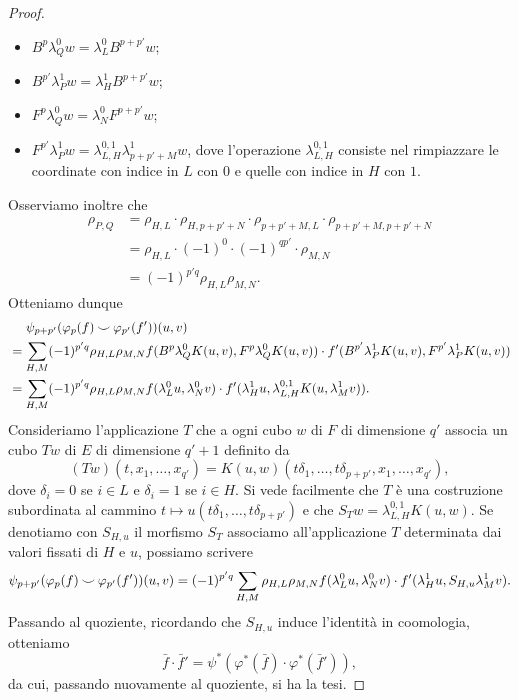 \begin{proof}
\begin{itemize}
\item $B^p\lambda^0_Qw=\lambda^0_LB^{p+p'}w$;
\item $B^{p'}\lambda^1_Pw=\lambda^1_HB^{p+p'}w$;
\item $F^p\lambda^0_Qw=\lambda^0_NF^{p+p'}w$;
\item $F^{p'}\lambda^1_Pw=\lambda^{0,1}_{L,H}\lambda^1_{p+p'+M}w$, dove l'operazione $\lambda^{0,1}_{L,H}$ consiste nel rimpiazzare le coordinate con indice in $L$ con $0$ e quelle con indice in $H$ con $1$.
\end{itemize}
Osserviamo inoltre che
\begin{align*}
\rho_{P,Q}&=\rho_{H,L}\cdot\rho_{H,p+p'+N}\cdot\rho_{p+p'+M,L}\cdot\rho_{p+p'+M,p+p'+N}\\
&=\rho_{H,L}\cdot (-1)^0\cdot(-1)^{qp'}\cdot\rho_{M,N}\\
&=(-1)^{p'q}\rho_{H,L}\rho_{M,N}.
\end{align*}
Otteniamo dunque
\begin{align*}
&\phantomop\psi_{p+p'}(\varphi_p(f)\cupp\varphi_{p'}(f'))(u,v)\\
&=\sum_{H,M}(-1)^{p'q}\rho_{H,L}\rho_{M,N} f(B^p\lambda^0_QK(u,v),F^p\lambda^0_QK(u,v))\cdot f'(B^{p'}\lambda^1_PK(u,v),F^{p'}\lambda^1_PK(u,v))\\
&=\sum_{H,M}(-1)^{p'q}\rho_{H,L}\rho_{M,N}f(\lambda^0_Lu,\lambda^0_Nv)\cdot f'(\lambda^1_Hu,\lambda^{0,1}_{L,H}K(u,\lambda^1_Mv)).
\end{align*}
Consideriamo l'applicazione $T$ che a ogni cubo $w$ di $F$ di dimensione $q'$ associa un cubo $Tw$ di $E$ di dimensione $q'+1$ definito da
$$
(Tw)(t,x_1,\ldots,x_{q'})=K(u,w)(t\delta_1,\ldots,t\delta_{p+p'},x_1,\ldots,x_{q'}),
$$
dove $\delta_i=0$ se $i\in L$ e $\delta_i=1$ se $i\in H$. Si vede facilmente che $T$ è una costruzione subordinata al cammino $t\mapsto u(t\delta_1,\ldots,t\delta_{p+p'})$ e che $S_Tw=\lambda^{0,1}_{L,H}K(u,w)$. Se denotiamo con $S_{H,u}$ il morfismo $S_T$ associamo all'applicazione $T$ determinata dai valori fissati di $H$ e $u$, possiamo scrivere
$$
\psi_{p+p'}(\varphi_p(f)\mathbin{\smile}\varphi_{p'}(f'))(u,v)=(-1)^{p'q}\sum_{H,M}\rho_{H,L}\rho_{M,N}f(\lambda^0_Lu,\lambda^0_Nv)\cdot f'(\lambda^1_Hu,S_{H,u}\lambda^1_Mv).
$$
Passando al quoziente, ricordando che $S_{H,u}$ induce l'identità in coomologia, otteniamo
$$
\bar{f}\cdot\bar{f}'=\psi^*(\varphi^*(\bar{f})\cdot\varphi^*(\bar{f}')),
$$
da cui, passando nuovamente al quoziente, si ha la tesi.
\end{proof}

